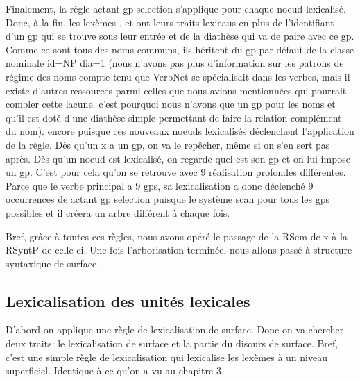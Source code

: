 Finalement, la règle actant gp selection s'applique pour chaque noeud lexicalisé. Donc, à la fin, les lexèmes , et  ont leurs traits lexicaus en plus de l'identifiant d'un gp qui se trouve sous leur entrée et de la diathèse qui va de paire avec ce gp. Comme ce sont tous des noms communs, ils héritent du gp par défaut de la classe nominale id=NP dia=1 (nous n'avons pas plus d'information sur les patrons de régime des noms compte tenu que VerbNet se spécialisait dans les verbes, mais il existe d'autres ressources parmi celles que nous avions mentionnées qui pourrait combler cette lacune. c'est pourquoi nous n'avons que un gp pour les noms et qu'il est doté d'une diathèse simple permettant de faire la relation complément du nom). encore puisque ces nouveaux noeuds lexicalisés déclenchent l'application de la règle. Dès qu'un x a un gp, on va le repêcher, même si on s'en sert pas après. Dès qu'un noeud est lexicalisé, on regarde quel est son gp et on lui impose un gp. C'est pour cela qu'on se retrouve avec 9 réalisation profondes différentes. Parce que le verbe principal a 9 gps, sa lexicalisation a donc déclenché 9 occurrences de actant gp selection puisque le système scan pour tous les gps possibles et il créera un arbre différent à chaque fois.

Bref, grâce à toutes ces règles, nous avons opéré le passage de la RSem de x à la RSyntP de celle-ci. Une fois l'arborisation terminée, nous allons passé à structure syntaxique de surface.

\subsection{Lexicalisation des unités lexicales}
D'abord on applique une règle de lexicalisation de surface. Donc on va chercher deux traits: le lexicalisation de surface et la partie du disours de surface. Bref, c'est une simple règle de lexicalisation qui lexicalise les lexèmes à un niveau superficiel. Identique à ce qu'on a vu au chapitre 3.

